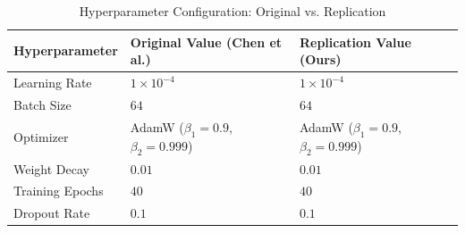 \begin{table}[H]
\centering
\caption{Hyperparameter Configuration: Original vs. Replication}
\label{tab:hyperparameters}
\begin{tabularx}{\textwidth}{l X X}
\toprule
\textbf{Hyperparameter} & \textbf{Original Value (Chen et al.)} & \textbf{Replication Value (Ours)} \\
\midrule
Learning Rate & $1 \times 10^{-4}$ & $1 \times 10^{-4}$ \\
Batch Size & $64$ & $64$ \\
Optimizer & AdamW ($\beta_1=0.9$, $\beta_2=0.999$) & AdamW ($\beta_1=0.9$, $\beta_2=0.999$) \\
Weight Decay & $0.01$ & $0.01$ \\
Training Epochs & $40$ & $40$ \\
Dropout Rate & $0.1$ & $0.1$ \\
\bottomrule
\end{tabularx}
\end{table}
